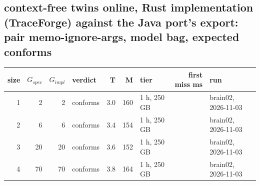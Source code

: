 \documentclass[10pt]{article}
\begin{document}
\subsection*{context-free twins online, Rust implementation (TraceForge) against the Java port's export: pair \textsf{memo-ignore-args}, model bag, expected conforms}
\begin{longtable}{@{}rrrlrrlrl@{}}
\toprule
size & $G_{\mathit{spec}}$ & $G_{\mathit{impl}}$ & verdict & T & M & tier & first miss ms & run \\
\midrule
\endhead
\color{red} 1 & 2 & 2 & conforms & 3.0 & 160 & 1 h, 250 GB &  & brain02, 2026-11-03 \\
\color{red} 2 & 6 & 6 & conforms & 3.4 & 154 & 1 h, 250 GB &  & brain02, 2026-11-03 \\
\color{red} 3 & 20 & 20 & conforms & 3.6 & 152 & 1 h, 250 GB &  & brain02, 2026-11-03 \\
\color{red} 4 & 70 & 70 & conforms & 3.8 & 164 & 1 h, 250 GB &  & brain02, 2026-11-03 \\
\bottomrule
\end{longtable}
\end{document}
